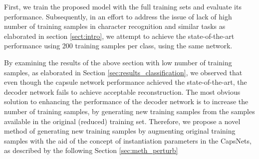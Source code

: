 
First, we train the proposed model with the full training sets and evaluate its performance. Subsequently, in an effort to address the issue of lack of high number of training samples in character recognition and similar tasks as elaborated in section \ref{sect:intro}, we attempt to achieve the state-of-the-art performance using 200 training samples per class, using the same network.


By examining the results of the above section with low number of training samples, as elaborated in Section \ref{sec:results_classification}, we observed that even though the capsule network performance achieved the state-of-the-art, the decoder network fails to achieve acceptable reconstruction. The most obvious solution to enhancing the performance of the decoder network is to increase the number of training samples, by generating new training samples from the samples available in the original (reduced) training set. Therefore, we propose a novel method of generating new training samples by augmenting original training samples with the aid of the concept of instantiation parameters in the CapsNets, as described by the following Section \ref{sec:meth_perturb}

